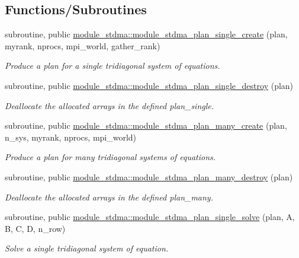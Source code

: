 \subsection*{Functions/\+Subroutines}
\begin{DoxyCompactItemize}
\item 
subroutine, public \mbox{\hyperlink{namespacemodule__stdma_af1e75db96d40d895493a1d46fd1d044b}{module\+\_\+stdma\+::module\+\_\+stdma\+\_\+plan\+\_\+single\+\_\+create}} (plan, myrank, nprocs, mpi\+\_\+world, gather\+\_\+rank)
\begin{DoxyCompactList}\small\item\em Produce a plan for a single tridiagonal system of equations. \end{DoxyCompactList}\item 
subroutine, public \mbox{\hyperlink{namespacemodule__stdma_afad99ac77e49d1b335d1a088d9ce0de9}{module\+\_\+stdma\+::module\+\_\+stdma\+\_\+plan\+\_\+single\+\_\+destroy}} (plan)
\begin{DoxyCompactList}\small\item\em Deallocate the allocated arrays in the defined plan\+\_\+single. \end{DoxyCompactList}\item 
subroutine, public \mbox{\hyperlink{namespacemodule__stdma_ac68f17b987232c3daacbb844bd52d67e}{module\+\_\+stdma\+::module\+\_\+stdma\+\_\+plan\+\_\+many\+\_\+create}} (plan, n\+\_\+sys, myrank, nprocs, mpi\+\_\+world)
\begin{DoxyCompactList}\small\item\em Produce a plan for many tridiagonal systems of equations. \end{DoxyCompactList}\item 
subroutine, public \mbox{\hyperlink{namespacemodule__stdma_a4ff32ed335c7df121dbb0be635a29287}{module\+\_\+stdma\+::module\+\_\+stdma\+\_\+plan\+\_\+many\+\_\+destroy}} (plan)
\begin{DoxyCompactList}\small\item\em Deallocate the allocated arrays in the defined plan\+\_\+many. \end{DoxyCompactList}\item 
subroutine, public \mbox{\hyperlink{namespacemodule__stdma_a01a73c00d5295d293827efc2b542c9e2}{module\+\_\+stdma\+::module\+\_\+stdma\+\_\+plan\+\_\+single\+\_\+solve}} (plan, A, B, C, D, n\+\_\+row)
\begin{DoxyCompactList}\small\item\em Solve a single tridiagonal system of equation. \end{DoxyCompactList}\item 

\end{DoxyCompactItemize}
